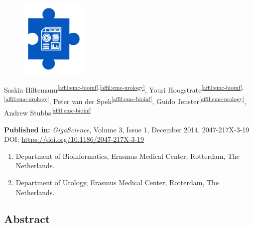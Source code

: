 \cleartorightpage
\setcounter{NAT@ctr}{-1}

\chapter*{}\label{chapter:ireport}
{}

\begin{figure}[t!]
\centering
\includegraphics[height=10em]{frontmatter/images/chapter-header-ireport.png}
\end{figure}
\vspace{-4cm}

Saskia Hiltemann\textsuperscript{\ref{affil:emc-bioinf},\ref{affil:emc-urology}},
Youri Hoogstrate\textsuperscript{\ref{affil:emc-bioinf},\ref{affil:emc-urology}},
Peter van der Spek\textsuperscript{\ref{affil:emc-bioinf}},
Guido Jenster\textsuperscript{\ref{affil:emc-urology}},
Andrew Stubbs\textsuperscript{\ref{affil:emc-bioinf}}

\textbf{Published in:} \emph{GigaScience}, Volume 3, Issue 1, December 2014, 2047-217X-3-19 \\
DOI: \url{https://doi.org/10.1186/2047-217X-3-19}

\small
\begin{enumerate}
\itemsep-0.5em
\item Department of Bioinformatics, Erasmus Medical Center, Rotterdam, The Netherlands. \label{affil:emc-bioinf}
\item Department of Urology, Erasmus Medical Center, Rotterdam, The Netherlands. \label{affil:emc-urology}
\end{enumerate}
\normalsize



\section*{Abstract}

